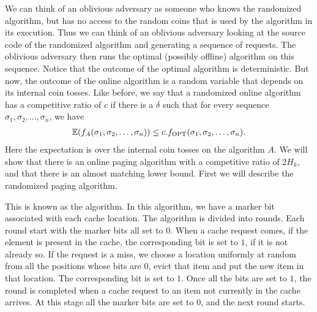 We can think of an oblivious adversary as someone who knows the randomized algorithm, but has no access to the random coins that is used by the algorithm in its execution. Thus we can think of an oblivious adversary looking at the source code of the randomized algorithm and generating a sequence of requests. The oblivious adversary then runs the optimal (possibly offline) algorithm on this sequence. Notice that the outcome of the optimal algorithm is deterministic. But now, the outcome of the online algorithm is a random variable that depends on its internal coin tosses. Like before, we say that a randomized online algorithm has a competitive ratio of $c$ if there is a $\delta$ such that for every sequence $\sigma_1, \sigma_2, \ldots, \sigma_n$, we have
\begin{align*}
	\mathbb{E}(f_A(\sigma_1,\sigma_2,\ldots,\sigma_n)) \leq c. f_{\operatorname{OPT}}(\sigma_1, \sigma_2, \ldots, \sigma_n).
\end{align*}
Here the expectation is over the internal coin tosses on the algorithm $A$. We will show that there is an online paging algorithm with a competitive ratio of $2H_k$, and that there is an almost matching lower bound. First we will describe the randomized paging algorithm.

This is known as the \marker algorithm. In this algorithm, we have a marker bit associated with each cache location. The algorithm is divided into rounds. Each round start with the marker bits all set to $0$. When a cache request comes, if the element is present in the cache, the corresponding bit is set to $1$, if it is not already so. If the request is a miss, we choose a location uniformly at random from all the positions whose bits are $0$, evict that item and put the new item in that location. The corresponding bit is set to $1$. Once all the bits are set to $1$, the round is completed when a cache request to an item not currently in the cache arrives. At this stage all the marker bits are set to $0$, and the next round starts.

